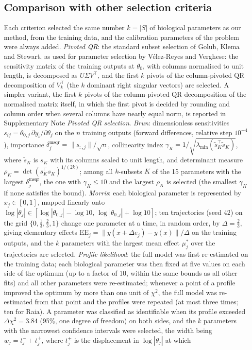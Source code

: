 \documentclass[pdflatex,sn-nature]{sn-jnl}
\theoremstyle{plain}
\begin{document}
\subsection*{Comparison with other selection criteria}\label{met:comparison}

Each criterion selected the same number $k=|S|$ of biological parameters as our method, from the training data, and the calibration parameters of the problem were always added. \emph{Pivoted QR}: the standard subset selection of Golub, Klema and Stewart\cite{bib57,bib54}, as used for parameter selection by V\'elez-Reyes and Verghese\cite{bib40}: the sensitivity matrix of the training outputs at $\theta_0$, with columns normalised to unit length, is decomposed as $U\Sigma V^{\top}$, and the first $k$ pivots of the column-pivoted QR decomposition of $V_k^{\top}$ (the $k$ dominant right singular vectors) are selected. A simpler variant, the first $k$ pivots of the column-pivoted QR decomposition of the normalised matrix itself, in which the first pivot is decided by rounding and column order when several columns have nearly equal norm, is reported in Supplementary Note \textit{Pivoted QR selection}. \emph{Brun}\cite{bib9}: dimensionless sensitivities $s_{ij}=\theta_{0,j}\,\partial y_i/\partial\theta_j$ on the $n$ training outputs (forward differences, relative step $10^{-4}$), importance $\delta^{\mathrm{msqr}}_j=\|s_{:,j}\|/\sqrt{n}$, collinearity index $\gamma_K=1/\sqrt{\lambda_{\min}(\tilde s_K^{\top}\tilde s_K)}$, where $\tilde s_K$ is $s_K$ with its columns scaled to unit length, and determinant measure $\rho_K=\det(s_K^{\top}s_K)^{1/(2k)}$; among all $k$-subsets $K$ of the 15 parameters with the largest $\delta^{\mathrm{msqr}}_j$, the one with $\gamma_K\le10$ and the largest $\rho_K$ is selected (the smallest $\gamma_K$ if none satisfies the bound). \emph{Morris}\cite{bib23}: each biological parameter is represented by $x_j\in[0,1]$, mapped linearly onto $\log|\theta_j|\in[\log|\theta_{0,j}|-\log10,\,\log|\theta_{0,j}|+\log10]$; ten trajectories (seed 42) on the grid $\{0,\frac13,\frac23,1\}$ change one parameter at a time, in random order, by $\Delta=\frac23$, giving elementary effects $\mathrm{EE}_j=\|y(x+\Delta e_j)-y(x)\|/\Delta$ on the training outputs, and the $k$ parameters with the largest mean effect $\mu^\ast_j$ over the trajectories are selected. \label{met:comp-pl}\emph{Profile likelihood}\cite{bib24,bib37}: the full model was first re-estimated on the training data; each biological parameter was then fixed at five values on each side of the optimum (up to a factor of 10, within the same bounds as all other fits) and all other parameters were re-estimated; whenever a point of a profile improved the optimum by more than one unit of $\chi^2$, the full model was re-estimated from that point and the profiles were repeated (at most three times; ten for Raia). A parameter was classified as identifiable when its profile exceeded $\Delta\chi^2=3.84$ (95\%, one degree of freedom) on both sides, and the $k$ parameters with the narrowest confidence intervals were selected, the width being $w_j=t_j^-+t_j^+$, where $t_j^\pm$ is the displacement in $\log|\theta_j|$ at which 
\end{document}
